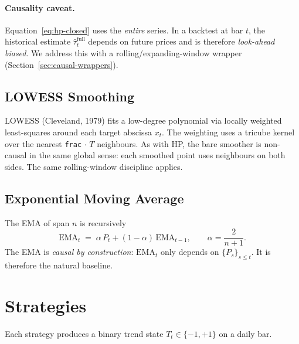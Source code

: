 \documentclass[11pt,a4paper]{article}
\begin{document}
\paragraph{Causality caveat.} Equation~\eqref{eq:hp-closed} uses the
\emph{entire} series. In a backtest at bar $t$, the historical estimate
$\widehat{\tau}_t^{\text{full}}$ depends on future prices and is therefore
\emph{look-ahead biased}. We address this with a rolling/expanding-window
wrapper (Section~\ref{sec:causal-wrappers}).

\subsection{LOWESS Smoothing}

LOWESS (Cleveland, 1979) fits a low-degree polynomial via locally weighted
least-squares around each target abscissa $x_t$. The weighting uses a
tricube kernel over the nearest \texttt{frac}$\,\cdot\,T$ neighbours. As with
HP, the bare smoother is non-causal in the same global sense: each smoothed
point uses neighbours on both sides. The same rolling-window discipline applies.

\subsection{Exponential Moving Average}

The EMA of span $n$ is recursively
\begin{equation}
\text{EMA}_t \;=\; \alpha\,P_t + (1-\alpha)\,\text{EMA}_{t-1},\qquad \alpha = \frac{2}{n+1}.
\end{equation}
The EMA is \emph{causal by construction}: $\text{EMA}_t$ only depends on
$\{P_s\}_{s\le t}$. It is therefore the natural baseline.

\section{Strategies}\label{sec:strategies}

Each strategy produces a binary trend state $T_t\in\{-1,+1\}$ on a daily bar.
\end{document}
